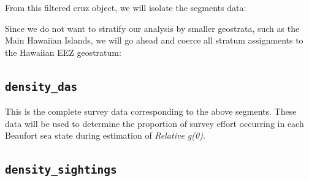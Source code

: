 \documentclass[
]{book}
\newenvironment{Shaded}{\begin{snugshade}}{\end{snugshade}}
\newcommand{\NormalTok}[1]{#1}
\newcommand{\OtherTok}[1]{\textcolor[rgb]{0.56,0.35,0.01}{#1}}
\newcommand{\SpecialCharTok}[1]{\textcolor[rgb]{0.81,0.36,0.00}{\textbf{#1}}}
\newcommand{\StringTok}[1]{\textcolor[rgb]{0.31,0.60,0.02}{#1}}
\begin{document}
From this filtered cruz object, we will isolate the segments data:

\begin{Shaded}
\end{Shaded}

Since we do not want to stratify our analysis by smaller geostrata, such as the Main Hawaiian Islands, we will go ahead and coerce all stratum assignments to the Hawaiian EEZ geostratum:

\begin{Shaded}
\end{Shaded}

\hypertarget{density_das}{%
\subsection*{\texorpdfstring{\texttt{density\_das}}{density\_das}}\label{density_das}}

This is the complete survey data corresponding to the above segments. These data will be used to determine the proportion of survey effort occurring in each Beaufort sea state during estimation of \emph{Relative g(0)}.

\begin{Shaded}
\end{Shaded}

\hypertarget{density_sightings}{%
\subsection*{\texorpdfstring{\texttt{density\_sightings}}{density\_sightings}}\label{density_sightings}}
\end{document}
